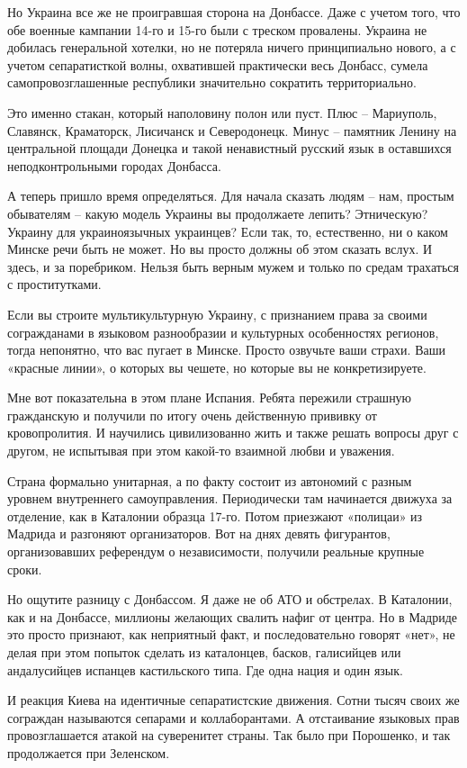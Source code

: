 Но Украина все же не проигравшая сторона на Донбассе. Даже с учетом того, что
обе военные кампании 14-го и 15-го были с треском провалены. Украина не
добилась генеральной хотелки, но не потеряла ничего принципиально нового, а с
учетом сепаратисткой волны, охватившей практически весь Донбасс, сумела
самопровозглашенные республики значительно сократить территориально.

Это именно стакан, который наполовину полон или пуст. Плюс – Мариуполь,
Славянск, Краматорск, Лисичанск и Северодонецк. Минус – памятник Ленину на
центральной площади Донецка и такой ненавистный русский язык в оставшихся
неподконтрольными городах Донбасса.

А теперь пришло время определяться. Для начала сказать людям – нам, простым
обывателям – какую модель Украины вы продолжаете лепить? Этническую? Украину
для украиноязычных украинцев? Если так, то, естественно, ни о каком Минске речи
быть не может. Но вы просто должны об этом сказать вслух. И здесь, и за
поребриком. Нельзя быть верным мужем и только по средам трахаться с
проститутками.

Если вы строите мультикультурную Украину, с признанием права за своими
согражданами в языковом разнообразии и культурных особенностях регионов, тогда
непонятно, что вас пугает в Минске. Просто озвучьте ваши страхи. Ваши «красные
линии», о которых вы чешете, но которые вы не конкретизируете.

Мне вот показательна в этом плане Испания. Ребята пережили страшную гражданскую
и получили по итогу очень действенную прививку от кровопролития. И научились
цивилизованно жить и также решать вопросы друг с другом, не испытывая при этом
какой-то взаимной любви и уважения.

Страна формально унитарная, а по факту состоит из автономий с разным уровнем
внутреннего самоуправления. Периодически там начинается движуха за отделение,
как в Каталонии образца 17-го. Потом приезжают «полицаи» из Мадрида и разгоняют
организаторов. Вот на днях девять фигурантов, организовавших референдум о
независимости, получили реальные крупные сроки.

Но ощутите разницу с Донбассом. Я даже не об АТО и обстрелах. В Каталонии, как
и на Донбассе, миллионы желающих свалить нафиг от центра. Но в Мадриде это
просто признают, как неприятный факт, и последовательно говорят «нет», не делая
при этом попыток сделать из каталонцев, басков, галисийцев или андалусийцев
испанцев кастильского типа. Где одна нация и один язык.

И реакция Киева на идентичные сепаратистские движения. Сотни тысяч своих же
сограждан называются сепарами и коллаборантами. А отстаивание языковых прав
провозглашается атакой на суверенитет страны. Так было при Порошенко, и так
продолжается при Зеленском.

